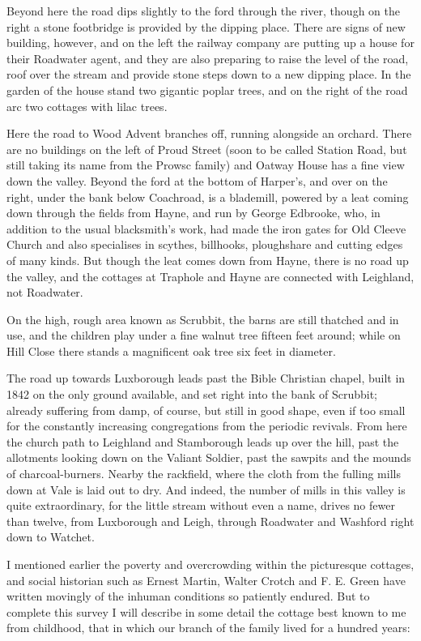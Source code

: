 Beyond here the road dips slightly to the ford through the river, though on the right a stone footbridge is provided by the dipping place. There are signs of new building, however, and on the left the railway company are putting up a house for their Roadwater agent, and they are also preparing to raise the level of the road, roof over the stream and provide stone steps down to a new dipping place. In the garden of the house stand two gigantic poplar trees, and on the right of the road arc two cottages with lilac trees.

Here the road to Wood Advent branches off, running alongside an orchard. There are no buildings on the left of Proud Street (soon to be called Station Road, but still taking its name from the Prowsc family) and Oatway House has a fine view down the valley. Beyond the ford at the bottom of Harper's, and over on the right, under the bank below Coachroad, is a blademill, powered by a leat coming down through the fields from Hayne, and run by George Edbrooke, who, in addition to the usual blacksmith's work, had made the iron gates for Old Cleeve Church and also specialises in scythes, billhooks, ploughshare and cutting edges of many kinds. But though the leat comes down from Hayne, there is no road up the valley, and the cottages at Traphole and Hayne are connected with Leighland, not Roadwater.

On the high, rough area known as Scrubbit, the barns are still thatched and in use, and the children play under a fine walnut tree fifteen feet around; while on Hill Close there stands a magnificent oak tree six feet in diameter.

The road up towards Luxborough leads past the Bible Christian chapel, built in 1842 on the only ground available, and set right into the bank of Scrubbit; already suffering from damp, of course, but still in good shape, even if too small for the constantly increasing congregations from the periodic revivals. From here the church path to Leighland and Stamborough leads up over the hill, past the allotments looking down on the Valiant Soldier, past the sawpits and the mounds of charcoal-burners. Nearby the rackfield, where the cloth from the fulling mills down at Vale is laid out to dry. And indeed, the number of mills in this valley is quite extraordinary, for the little stream without even a name, drives no fewer than twelve, from Luxborough and Leigh, through Roadwater and Washford right down to Watchet.

I mentioned earlier the poverty and overcrowding within the picturesque cottages, and social historian such as Ernest Martin, Walter Crotch and F. E.  Green have written movingly of the inhuman conditions so patiently endured. But to complete this survey I will describe in some detail the cottage best known to me from childhood, that in which our branch of the family lived for a hundred years:

